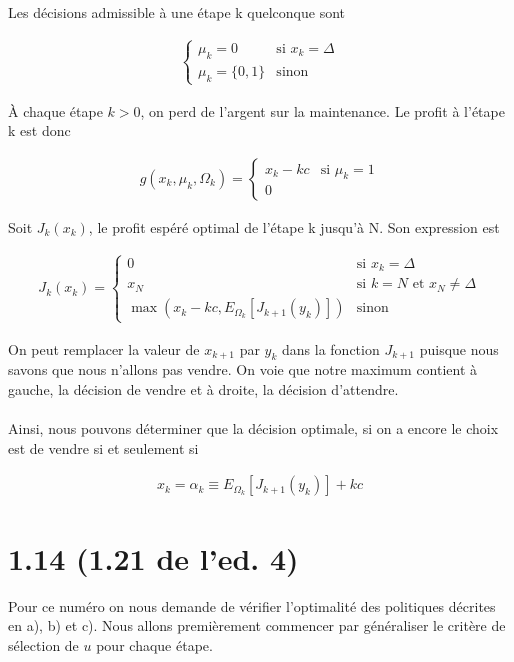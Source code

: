 \documentclass[oneside]{book}
\begin{document}
Les décisions admissible à une étape k quelconque sont 

\begin{gather*}
\begin{cases}
\mu_k = 0 &\text{si  } x_k = \Delta \\
\mu_k = \{0, 1\} &\text{sinon}
\end{cases}
\end{gather*}

À chaque étape $k > 0$, on perd de l'argent sur la maintenance. Le profit à l'étape k est donc 

\begin{gather*}
g(x_k, \mu_k, \Omega_k) =
\begin{cases}
x_k - kc &\text{si  } \mu_k = 1 \\
0
\end{cases}
\end{gather*}

Soit $J_k(x_k)$, le profit espéré optimal de l'étape k jusqu'à N. Son expression est 

\begin{gather*}
J_k(x_k) = 
\begin{cases}
0 &\text{si  } x_k = \Delta \\
x_N &\text{si  } k = N \text{ et } x_N \neq \Delta \\
\max\left(x_k - kc, E_{\Omega_k}\left[J_{k+1}(y_{k})\right]\right) &\text{sinon}
\end{cases}
\end{gather*}

On peut remplacer la valeur de $x_{k+1}$ par $y_k$ dans la fonction $J_{k+1}$ puisque nous savons que nous n'allons pas vendre. On voie que notre maximum contient à gauche, la décision de vendre et à droite, la décision d'attendre.
\\\\
Ainsi, nous pouvons déterminer que la décision optimale, si on a encore le choix est de vendre si et seulement si 

\begin{gather*}
x_k = \alpha_k \equiv E_{\Omega_k}\left[J_{k+1}(y_{k})\right] + kc
\end{gather*}


\section*{1.14 (1.21 de l'ed. 4)}
Pour ce numéro on nous demande de vérifier l'optimalité des politiques décrites en a), b) et c). Nous allons premièrement commencer par généraliser le critère de sélection de $u$ pour chaque étape.\\
\end{document}
